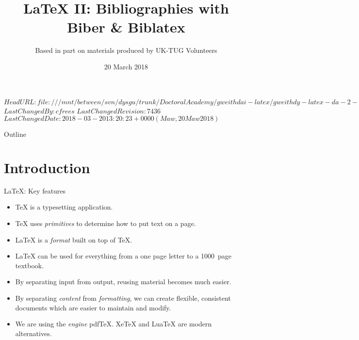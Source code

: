 \svnidlong
{$HeadURL: file:///mnt/between/svn/dysgu/trunk/DoctoralAcademy/gweithdai-latex/gweithdy-latex-da-2-biblatex/training.tex $}
{$LastChangedBy: cfrees $}
{$LastChangedRevision: 7436 $}
{$LastChangedDate: 2018-03-20 13:20:23 +0000 (Maw, 20 Maw 2018) $}



\title{\LaTeX{} II: Bibliographies with Biber \& Biblatex}
\subtitle{Based in part on materials produced by UK-TUG Volunteers}
\date{ 20 March 2018}




\begin{frame}
  \titlepage
\end{frame}

\maketitle


\tableofcontents

%
{
  \begin{frame}{Outline}
    \tableofcontents
  \end{frame}
}

%

\section{Introduction}

\begin{frame}{\LaTeX{}: Key features}

  \begin{itemize}
    \item \TeX{} is a typesetting application.
    \item \TeX{} uses \emph{primitives} to determine how to put text on a page.
    \item \LaTeX{} is  a \emph{format} built on top of \TeX{}.
    \item \LaTeX{} can be used for everything from a one page letter to a 1000~page textbook.
    \item By separating input from output, reusing material becomes much easier.
    \item By separating \emph{content} from \emph{formatting}, we can create flexible, consistent documents which are easier to maintain and modify.
    \item We are using the \emph{engine} pdf\TeX{}.
    Xe\TeX{} and Lua\TeX{} are modern alternatives.
  \end{itemize}

\end{frame}

